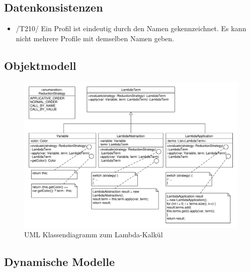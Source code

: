 \subsection{Datenkonsistenzen}

\begin{itemize}
\item /T210/ Ein Profil ist eindeutig durch den Namen gekennzeichnet. Es kann nicht mehrere Profile mit demselben Namen geben.
\end{itemize}

\subsection{Objektmodell}

\begin{figure}[H]
\centering
\includegraphics[scale=0.5]{../system_models/object_models/lambda_calculus.pdf}
\caption{UML Klassendiagramm zum Lambda-Kalkül}
\end{figure}

\subsection{Dynamische Modelle}

